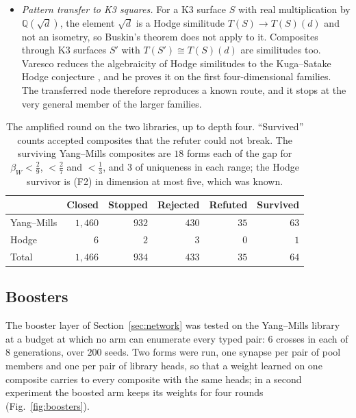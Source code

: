 \begin{itemize}[leftmargin=*,itemsep=1pt]
\item \emph{Pattern transfer to K3 squares.} For a K3 surface $S$ with real multiplication by $\mathbb{Q}(\sqrt d)$, the element $\sqrt d$ is a Hodge similitude $T(S)\to T(S)(d)$ and not an isometry, so Buskin's theorem does not apply to it. Composites through K3 surfaces $S'$ with $T(S')\cong T(S)(d)$ are similitudes too. Varesco reduces the algebraicity of Hodge similitudes to the Kuga--Satake Hodge conjecture \cite{Var23}, and he proves it on the first four-dimensional families. The transferred node therefore reproduces a known route, and it stops at the very general member of the larger families.
\end{itemize}

\begin{table}[t]
\caption{The amplified round on the two libraries, up to depth four. ``Survived'' counts accepted composites that the refuter could not break. The surviving Yang--Mills composites are $18$ forms each of the gap for $\beta_{W}<\frac29$, $<\frac27$ and $<\frac13$, and $3$ of uniqueness in each range; the Hodge survivor is (F2) in dimension at most five, which was known.}
\label{tab:amplify}
\centering
\footnotesize
\setlength{\tabcolsep}{4pt}
\begin{tabular}{@{}lrrrrr@{}}
\toprule
& Closed & Stopped & Rejected & Refuted & Survived \\
\midrule
Yang--Mills & $1{,}460$ & $932$ & $430$ & $35$ & $63$ \\
Hodge & $6$ & $2$ & $3$ & $0$ & $1$ \\
\midrule
Total & $1{,}466$ & $934$ & $433$ & $35$ & $64$ \\
\bottomrule
\end{tabular}
\end{table}

\subsection{Boosters}\label{ssec:boosters}

The booster layer of Section~\ref{sec:network} was tested on the Yang--Mills library at a budget at which no arm can enumerate every typed pair: $6$ crosses in each of $8$ generations, over $200$ seeds. Two forms were run, one synapse per pair of pool members and one per pair of library heads, so that a weight learned on one composite carries to every composite with the same heads; in a second experiment the boosted arm keeps its weights for four rounds (Fig.~\ref{fig:boosters}).

